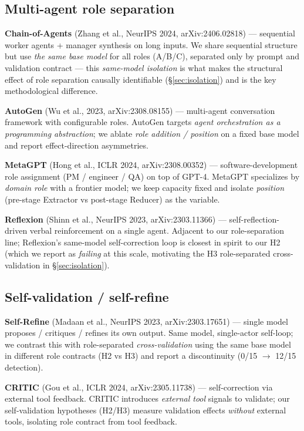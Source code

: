 \documentclass[11pt]{article}
\begin{document}
\subsection{Multi-agent role separation}
\textbf{Chain-of-Agents} (Zhang et al., NeurIPS 2024, arXiv:2406.02818) --- sequential worker agents + manager synthesis on long inputs. We share sequential structure but use \emph{the same base model} for all roles (A/B/C), separated only by prompt and validation contract --- this \emph{same-model isolation} is what makes the structural effect of role separation causally identifiable (\S\ref{sec:isolation}) and is the key methodological difference.
\par\smallskip
\textbf{AutoGen} (Wu et al., 2023, arXiv:2308.08155) --- multi-agent conversation framework with configurable roles. AutoGen targets \emph{agent orchestration as a programming abstraction}; we ablate \emph{role addition / position} on a fixed base model and report effect-direction asymmetries.
\par\smallskip
\textbf{MetaGPT} (Hong et al., ICLR 2024, arXiv:2308.00352) --- software-development role assignment (PM / engineer / QA) on top of GPT-4. MetaGPT specializes by \emph{domain role} with a frontier model; we keep capacity fixed and isolate \emph{position} (pre-stage Extractor vs post-stage Reducer) as the variable.
\par\smallskip
\textbf{Reflexion} (Shinn et al., NeurIPS 2023, arXiv:2303.11366) --- self-reflection-driven verbal reinforcement on a single agent. Adjacent to our role-separation line; Reflexion's same-model self-correction loop is closest in spirit to our H2 (which we report as \emph{failing} at this scale, motivating the H3 role-separated cross-validation in \S\ref{sec:isolation}).

\subsection{Self-validation / self-refine}
\textbf{Self-Refine} (Madaan et al., NeurIPS 2023, arXiv:2303.17651) --- single model proposes / critiques / refines its own output. Same model, single-actor self-loop; we contrast this with role-separated \emph{cross-validation} using the same base model in different role contracts (H2 vs H3) and report a discontinuity (0/15 $\to$ 12/15 detection).
\par\smallskip
\textbf{CRITIC} (Gou et al., ICLR 2024, arXiv:2305.11738) --- self-correction via external tool feedback. CRITIC introduces \emph{external tool} signals to validate; our self-validation hypotheses (H2/H3) measure validation effects \emph{without} external tools, isolating role contract from tool feedback.
\end{document}
